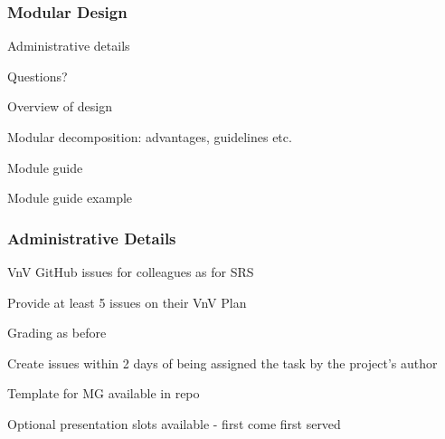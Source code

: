 \documentclass[t,12pt,numbers,fleqn]{beamer}
\begin{document}



\begin{frame}
\frametitle{Modular Design}

\bi
\item Administrative details
\item Questions?
\item Overview of design
\item Modular decomposition: advantages, guidelines etc.
\item Module guide
\item Module guide example
\ei
\end{frame}


\begin{frame}
\frametitle{Administrative Details}

\bi
\item VnV GitHub issues for colleagues as for SRS
\bi
\item Provide at least 5 issues on their VnV Plan
\item Grading as before
\item Create issues within 2 days of being assigned the task by the project's author
\ei
\item Template for MG available in repo
\item Optional presentation slots available - first come first served
\ei

\end{frame}

\end{document}

